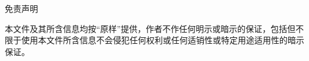 \begin{center}
    {\Large 免责声明}
\end{center}

本文件及其所含信息均按“原样”提供，作者不作任何明示或暗示的保证，包括但不限于使用本文件所含信息不会侵犯任何权利或任何适销性或特定用途适用性的暗示保证。